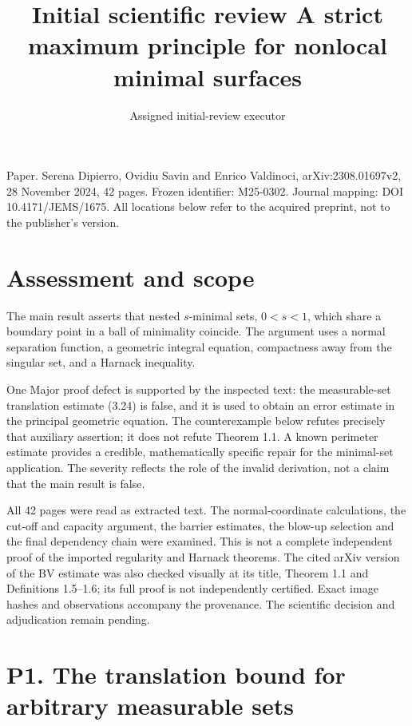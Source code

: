 \documentclass[10pt]{article}
\title{Initial scientific review
A strict maximum principle for nonlocal minimal surfaces}
\author{Assigned initial-review executor}
\date{}
\begin{document}
\maketitle
Paper. Serena Dipierro, Ovidiu Savin and Enrico Valdinoci, arXiv:2308.01697v2, 28 November 2024, 42 pages. Frozen identifier: M25-0302. Journal mapping: DOI 10.4171/JEMS/1675. All locations below refer to the acquired preprint, not to the publisher’s version.\par
\section*{Assessment and scope}
The main result asserts that nested \(s\)-minimal sets, \(0<s<1\), which share a boundary point in a ball of minimality coincide. The argument uses a normal separation function, a geometric integral equation, compactness away from the singular set, and a Harnack inequality.\par
One Major proof defect is supported by the inspected text: the measurable-set translation estimate (3.24) is false, and it is used to obtain an error estimate in the principal geometric equation. The counterexample below refutes precisely that auxiliary assertion; it does not refute Theorem 1.1. A known perimeter estimate provides a credible, mathematically specific repair for the minimal-set application. The severity reflects the role of the invalid derivation, not a claim that the main result is false.\par
All 42 pages were read as extracted text. The normal-coordinate calculations, the cut-off and capacity argument, the barrier estimates, the blow-up selection and the final dependency chain were examined. This is not a complete independent proof of the imported regularity and Harnack theorems. The cited arXiv version of the BV estimate was also checked visually at its title, Theorem 1.1 and Definitions 1.5–1.6; its full proof is not independently certified. Exact image hashes and observations accompany the provenance. The scientific decision and adjudication remain pending.\par
\section*{P1. The translation bound for arbitrary measurable sets}
\end{document}
